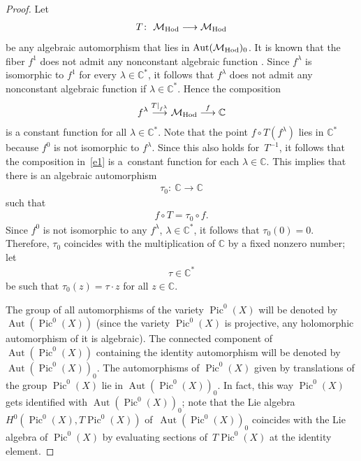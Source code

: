 \begin{proof} Let
\begin{gather*}
T \colon \ {\mathcal M}_{\rm Hod} \longrightarrow {\mathcal M}_{\rm Hod}
\end{gather*}
be any algebraic automorphism that lies in $\operatorname{Aut}({\mathcal M}_{\rm Hod})_0$. It is known that the f\/iber $f^1$ does not admit any nonconstant algebraic function \cite[Proposition~2.2]{BBS}. Since $f^\lambda$ is isomorphic to $f^1$ for every $\lambda \in {\mathbb C}^*$, it follows that $f^\lambda$ does not admit any nonconstant algebraic function if $\lambda \in {\mathbb C}^*$. Hence the composition
\begin{gather}\label{e1}
f^\lambda \stackrel{T\vert_{f^\lambda}}{\longrightarrow} {\mathcal M}_{\rm Hod} \stackrel{f}{\longrightarrow} \mathbb C
\end{gather}
is a constant function for all $\lambda \in {\mathbb C}^*$. Note that the point $f\circ T(f^{\lambda})$ lies in ${\mathbb C}^*$ because $f^0$ is not isomorphic to $f^\lambda$. Since this also holds for~$T^{-1}$, it follows that the composition in~\eqref{e1} is a~constant function for each $\lambda \in {\mathbb C}$. This implies that there is an algebraic automorphism
\begin{gather*}
\tau_0 \colon \ {\mathbb C} \longrightarrow \mathbb C
\end{gather*}
such that
\begin{gather*}
f\circ T = \tau_0 \circ f .
\end{gather*}
Since $f^0$ is not isomorphic to any $f^\lambda$, $\lambda \in {\mathbb C}^*$, it follows that $\tau_0(0) = 0$. Therefore, $\tau_0$ coincides with the multiplication of $\mathbb C$ by a f\/ixed nonzero number; let
\begin{gather}\label{e4}
\tau \in {\mathbb C}^*
\end{gather}
be such that $\tau_0(z) = \tau \cdot z$ for all $z \in \mathbb C$.

The group of all automorphisms of the variety $\operatorname{Pic}^0(X)$ will be denoted by $\operatorname{Aut}(\operatorname{Pic}^0(X))$ (since the variety $\operatorname{Pic}^0(X)$ is projective, any holomorphic automorphism of it is algebraic). The connected component of~$\operatorname{Aut}(\operatorname{Pic}^0(X))$ containing the identity automorphism will be denoted by~$\operatorname{Aut}(\operatorname{Pic}^0(X))_0$. The automorphisms of $\operatorname{Pic}^0(X)$ given by translations of the group $\operatorname{Pic}^0(X)$ lie in $\operatorname{Aut}(\operatorname{Pic}^0(X))_0$. In fact, this way $\operatorname{Pic}^0(X)$ gets identif\/ied with
$\operatorname{Aut}(\operatorname{Pic}^0(X))_0$; note that the Lie algebra $H^0(\operatorname{Pic}^0(X), T\operatorname{Pic}^0(X))$ of~$\operatorname{Aut}(\operatorname{Pic}^0(X))_0$ coincides with the Lie algebra of $\operatorname{Pic}^0(X)$ by evaluating sections of~$T\operatorname{Pic}^0(X)$ at the identity element.


\end{proof}
